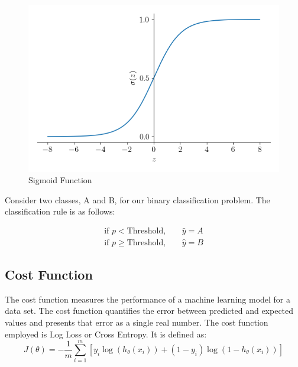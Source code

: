 \documentclass[conference]{IEEEtran}
\begin{document}
\begin{figure}[htbp]
\centerline{\includegraphics[scale = 0.6]{logistic regression.png}}
\caption{Sigmoid Function}
\label{fig}
\end{figure}

Consider two classes, A and B, for our binary classification problem. The classification rule is as follows:

\begin{align*}
\text{if } p < \text{Threshold}, & \quad \hat{y} = A \\
\text{if } p \geq \text{Threshold}, & \quad \hat{y} = B
\end{align*}

\subsection{Cost Function}
The cost function measures the performance of a machine learning model for a data set. The cost function quantifies the error between predicted and expected values and presents that error as a single real number. The cost function employed is Log Loss or Cross Entropy. It is defined as:
\[
J(\theta) = -\frac{1}{m} \sum_{i=1}^{m} \left[y_i\log(h_\theta(x_i)) + (1 - y_i)\log(1 - h_\theta(x_i))\right]
\]
\end{document}

